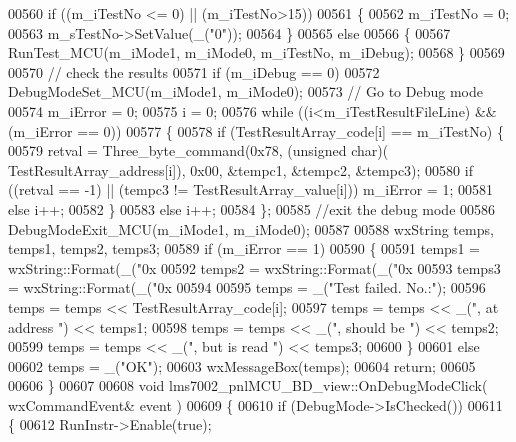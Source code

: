 \begin{DoxyCode}
{{{{{{{{{{{00560     \textcolor{keywordflow}{if} ((m_iTestNo <= 0) || (m_iTestNo>15))
00561     \{
00562         m_iTestNo = 0;
00563         m_sTestNo->SetValue(\_(\textcolor{stringliteral}{"0"}));
00564     \}
00565     \textcolor{keywordflow}{else}
00566     \{
00567         RunTest_MCU(m_iMode1, m_iMode0, m_iTestNo, m_iDebug);
00568     \}
00569 
00570     \textcolor{comment}{// check the results}
00571     \textcolor{keywordflow}{if} (m_iDebug == 0)
00572         DebugModeSet_MCU(m_iMode1, m_iMode0);
00573     \textcolor{comment}{// Go to Debug mode}
00574     m\_iError = 0;
00575     i = 0;
00576     \textcolor{keywordflow}{while} ((i<m_iTestResultFileLine) && (m\_iError == 0))
00577     \{
00578         \textcolor{keywordflow}{if} (TestResultArray_code[i] == m_iTestNo) \{
00579             retval = Three_byte_command(0x78, (\textcolor{keywordtype}{unsigned} \textcolor{keywordtype}{char})(
      TestResultArray_address[i]), 0x00, &tempc1, &tempc2, &tempc3);
00580             \textcolor{keywordflow}{if} ((retval == -1) || (tempc3 != TestResultArray_value[i])) m\_iError = 1;
00581             \textcolor{keywordflow}{else} i++;
00582         \}
00583         \textcolor{keywordflow}{else} i++;
00584     \};
00585     \textcolor{comment}{//exit the debug mode}
00586     DebugModeExit_MCU(m_iMode1, m_iMode0);
00587 
00588     wxString temps, temps1, temps2, temps3;
00589     \textcolor{keywordflow}{if} (m\_iError == 1)
00590     \{
00591         temps1 = wxString::Format(\_(\textcolor{stringliteral}{"0x%
00592         temps2 = wxString::Format(\_(\textcolor{stringliteral}{"0x%
00593         temps3 = wxString::Format(\_(\textcolor{stringliteral}{"0x%
00594 
00595         temps = \_(\textcolor{stringliteral}{"Test failed. No.:"});
00596         temps = temps << TestResultArray_code[i];
00597         temps = temps << \_(\textcolor{stringliteral}{", at address "}) << temps1;
00598         temps = temps << \_(\textcolor{stringliteral}{", should be "}) << temps2;
00599         temps = temps << \_(\textcolor{stringliteral}{", but is read "}) << temps3;
00600     \}
00601     \textcolor{keywordflow}{else}
00602         temps = \_(\textcolor{stringliteral}{"OK"});
00603     wxMessageBox(temps);
00604     \textcolor{keywordflow}{return};
00605 
00606 \}
00607 
00608 \textcolor{keywordtype}{void} lms7002_pnlMCU_BD_view::OnDebugModeClick( wxCommandEvent& event )
00609 \{
00610     \textcolor{keywordflow}{if} (DebugMode->IsChecked())
00611     \{
00612         RunInstr->Enable(\textcolor{keyword}{true});
}}}}}}}}}}}}}}
\end{DoxyCode}
